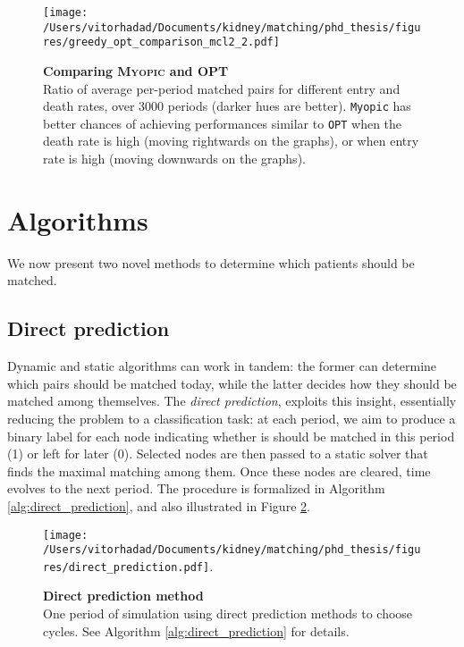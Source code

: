 \documentclass[format=acmsmall, review=false]{acmart}
\begin{document}
\begin{figure}[htbp]
\centering
\hspace*{-3.5cm}
\texttt{[image: /Users/vitorhadad/Documents/kidney/matching/phd\_thesis/figures/greedy\_opt\_comparison\_mcl2\_2.pdf]}
\caption{\textbf{Comparing \textsc{Myopic} and \textsc{OPT}}  \\
Ratio of average per-period matched pairs for different entry and death rates, over 3000 periods (darker hues are better). \texttt{Myopic} has better chances of achieving performances similar to \texttt{OPT} when the death rate is high (moving rightwards on the graphs), or when entry rate is high (moving downwards on the graphs).}
\label{fig:greedy_opt_comparison}
\end{figure}




\section{Algorithms}

We now present two novel methods to determine which patients should be matched.

\subsection{Direct prediction} \label{subsec:direct_prediction}

Dynamic and static algorithms can work in tandem: the former can determine which pairs should be matched today, while the latter decides how they should be matched among themselves. The \emph{direct prediction}, exploits this insight, essentially reducing the problem to a classification task: at each period, we aim to produce a binary label for each node indicating whether is should be matched in this period (1) or left for later (0). Selected nodes are then passed to a static solver that finds the maximal matching among them. Once these nodes are cleared, time evolves to the next period. The procedure is formalized in Algorithm \ref{alg:direct_prediction}, and also illustrated in Figure \ref{fig:direct_prediction}.

\begin{figure}[htbp]
\centering
\texttt{[image: /Users/vitorhadad/Documents/kidney/matching/phd\_thesis/figures/direct\_prediction.pdf]}.
\caption{\textbf{Direct prediction method} \\ One period of simulation using direct prediction methods to choose cycles. See Algorithm \ref{alg:direct_prediction} for details.}
\label{fig:direct_prediction}
\end{figure}
\end{document}
